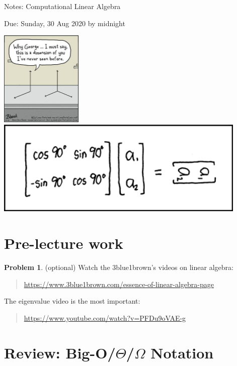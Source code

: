 \documentclass[10pt]{article}
\theoremstyle{definition}
\newtheorem{problem}{Problem}
\begin{document}
\begin{center}
{
\Huge
Notes: Computational Linear Algebra
}

\vspace{0.15in}
Due: Sunday, 30 Aug 2020 by midnight
\end{center}

\begin{center}
\includegraphics[height=1.8in]{comic}
\includegraphics[height=1.8in]{matrix_transform}
\end{center}


\section{Pre-lecture work}

\begin{problem}
    (optional) Watch the 3blue1brown's videos on linear algebra:
    \begin{quote}
        \url{https://www.3blue1brown.com/essence-of-linear-algebra-page}
    \end{quote}
    The eigenvalue video is the most important:
    \begin{quote}
        \url{https://www.youtube.com/watch?v=PFDu9oVAE-g}
    \end{quote}
\end{problem}


\section{Review: Big-O/$\Theta$/$\Omega$ Notation}
\end{document}
